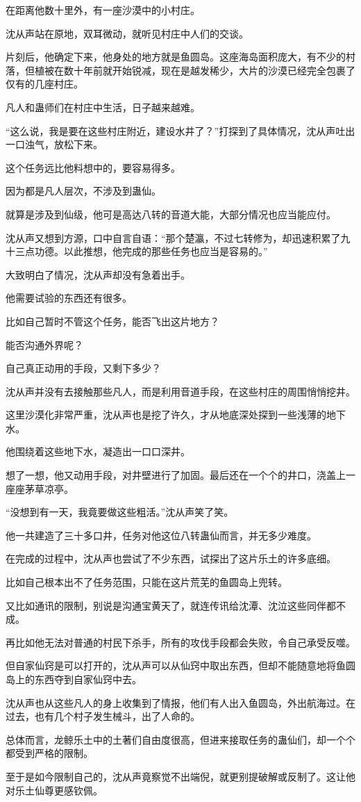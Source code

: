 \begin{this_body}
在距离他数十里外，有一座沙漠中的小村庄。

沈从声站在原地，双耳微动，就听见村庄中人们的交谈。

片刻后，他确定下来，他身处的地方就是鱼圆岛。这座海岛面积庞大，有不少的村落，但植被在数十年前就开始锐减，现在是越发稀少，大片的沙漠已经完全包裹了仅有的几座村庄。

凡人和蛊师们在村庄中生活，日子越来越难。

“这么说，我是要在这些村庄附近，建设水井了？”打探到了具体情况，沈从声吐出一口浊气，放松下来。

这个任务远比他料想中的，要容易得多。

因为都是凡人层次，不涉及到蛊仙。

就算是涉及到仙级，他可是高达八转的音道大能，大部分情况也应当能应付。

沈从声又想到方源，口中自言自语：“那个楚瀛，不过七转修为，却迅速积累了九十三点功德。以此推想，他完成的那些任务也应当是容易的。”

大致明白了情况，沈从声却没有急着出手。

他需要试验的东西还有很多。

比如自己暂时不管这个任务，能否飞出这片地方？

能否沟通外界呢？

自己真正动用的手段，又剩下多少？

沈从声并没有去接触那些凡人，而是利用音道手段，在这些村庄的周围悄悄挖井。

这里沙漠化非常严重，沈从声也是挖了许久，才从地底深处探到一些浅薄的地下水。

他围绕着这些地下水，凝造出一口口深井。

想了一想，他又动用手段，对井壁进行了加固。最后还在一个个的井口，浇盖上一座座茅草凉亭。

“没想到有一天，我竟要做这些粗活。”沈从声笑了笑。

他一共建造了三十多口井，任务对他这位八转蛊仙而言，并无多少难度。

在完成的过程中，沈从声也尝试了不少东西，试探出了这片乐土的许多底细。

比如自己根本出不了任务范围，只能在这片荒芜的鱼圆岛上兜转。

又比如通讯的限制，别说是沟通宝黄天了，就连传讯给沈潭、沈泣这些同伴都不成。

再比如他无法对普通的村民下杀手，所有的攻伐手段都会失败，令自己承受反噬。

但自家仙窍是可以打开的，沈从声可以从仙窍中取出东西，但却不能随意地将鱼圆岛上的东西夺到自家仙窍中去。

沈从声也从这些凡人的身上收集到了情报，他们有人出入鱼圆岛，外出航海过。在过去，也有几个村子发生械斗，出了人命的。

总体而言，龙鲸乐土中的土著们自由度很高，但进来接取任务的蛊仙们，却一个个都受到严格的限制。

至于是如今限制自己的，沈从声竟察觉不出端倪，就更别提破解或反制了。这让他对乐土仙尊更感钦佩。

\end{this_body}

